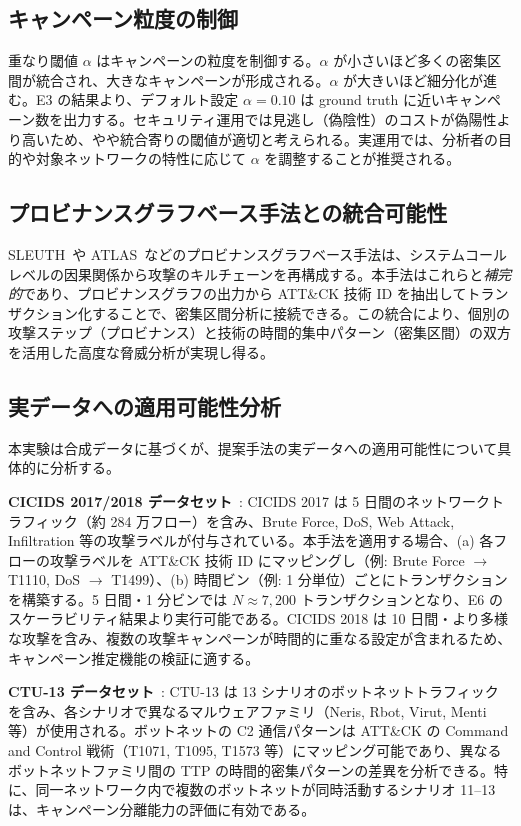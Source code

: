 \documentclass[11pt]{article}
\begin{document}
\subsection{キャンペーン粒度の制御}

重なり閾値 $\alpha$ はキャンペーンの粒度を制御する。$\alpha$ が小さいほど多くの密集区間が統合され、大きなキャンペーンが形成される。$\alpha$ が大きいほど細分化が進む。E3 の結果より、デフォルト設定 $\alpha = 0.10$ は ground truth に近いキャンペーン数を出力する。セキュリティ運用では見逃し（偽陰性）のコストが偽陽性より高いため、やや統合寄りの閾値が適切と考えられる。実運用では、分析者の目的や対象ネットワークの特性に応じて $\alpha$ を調整することが推奨される。

\subsection{プロビナンスグラフベース手法との統合可能性}

SLEUTH~\cite{hossain2017sleuth}や ATLAS~\cite{alsaheel2021atlas}などのプロビナンスグラフベース手法は、システムコールレベルの因果関係から攻撃のキルチェーンを再構成する。本手法はこれらと\emph{補完的}であり、プロビナンスグラフの出力から ATT\&CK 技術 ID を抽出してトランザクション化することで、密集区間分析に接続できる。この統合により、個別の攻撃ステップ（プロビナンス）と技術の時間的集中パターン（密集区間）の双方を活用した高度な脅威分析が実現し得る。

\subsection{実データへの適用可能性分析}
\label{sec:real_data_applicability}

本実験は合成データに基づくが、提案手法の実データへの適用可能性について具体的に分析する。

\textbf{CICIDS 2017/2018 データセット}~\cite{sharafaldin2018toward}: CICIDS 2017 は 5 日間のネットワークトラフィック（約 284 万フロー）を含み、Brute Force, DoS, Web Attack, Infiltration 等の攻撃ラベルが付与されている。本手法を適用する場合、(a) 各フローの攻撃ラベルを ATT\&CK 技術 ID にマッピングし（例: Brute Force $\to$ T1110, DoS $\to$ T1499）、(b) 時間ビン（例: 1 分単位）ごとにトランザクションを構築する。5 日間・1 分ビンでは $N \approx 7{,}200$ トランザクションとなり、E6 のスケーラビリティ結果より実行可能である。CICIDS 2018 は 10 日間・より多様な攻撃を含み、複数の攻撃キャンペーンが時間的に重なる設定が含まれるため、キャンペーン推定機能の検証に適する。

\textbf{CTU-13 データセット}~\cite{garcia2014empirical}: CTU-13 は 13 シナリオのボットネットトラフィックを含み、各シナリオで異なるマルウェアファミリ（Neris, Rbot, Virut, Menti 等）が使用される。ボットネットの C2 通信パターンは ATT\&CK の Command and Control 戦術（T1071, T1095, T1573 等）にマッピング可能であり、異なるボットネットファミリ間の TTP の時間的密集パターンの差異を分析できる。特に、同一ネットワーク内で複数のボットネットが同時活動するシナリオ 11--13 は、キャンペーン分離能力の評価に有効である。
\end{document}

